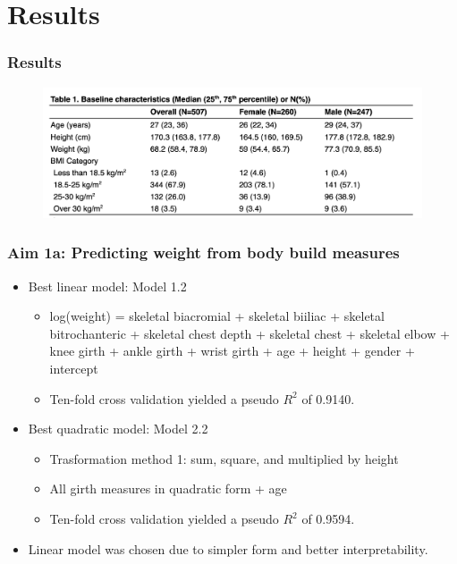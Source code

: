 \documentclass{beamer}
\begin{document}
\section{Results}

\begin{frame}
\frametitle{Results}

\begin{figure}
	\includegraphics[scale=0.35]{Table1.png}
	\label{fig:table1}
\end{figure}

\end{frame}

\begin{frame}
\frametitle{Aim 1a: Predicting weight from body build measures}
 
\begin{itemize}
	\item Best linear model: Model 1.2
		\begin{itemize}
			\item log(weight) = skeletal biacromial + skeletal biiliac + skeletal bitrochanteric + skeletal chest depth + skeletal chest + skeletal elbow + knee girth + ankle girth + wrist girth + age + height + gender + intercept 
			\item Ten-fold cross validation yielded a pseudo $R^2$ of 0.9140.
		\end{itemize}
	\item Best quadratic model: Model 2.2
		\begin{itemize}
			\item Trasformation method 1: sum, square, and multiplied by height
			\item All girth measures in quadratic form + age
			\item Ten-fold cross validation yielded a pseudo $R^2$ of 0.9594.
		\end{itemize}
	\item Linear model was chosen due to simpler form and better interpretability.  
\end{itemize}

\end{frame}
\end{document}
